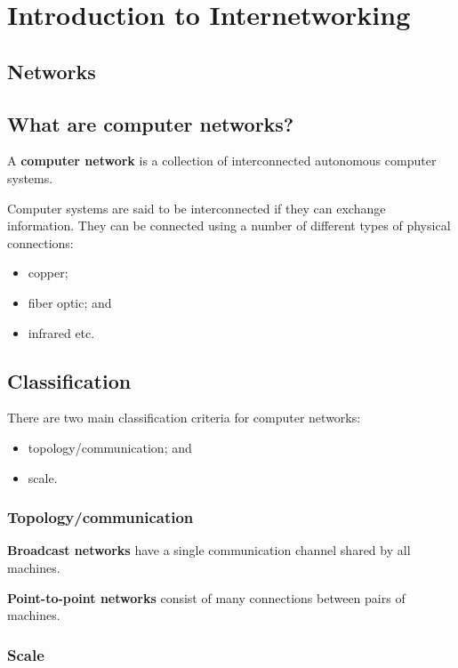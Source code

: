 \documentclass[a4paper]{systems-software}
\begin{document}
\chapter{Introduction to Internetworking}
\label{chap:12}

\section{Networks}

\section*{What are computer networks?}

A \textbf{computer network} is a collection of interconnected autonomous computer systems.

Computer systems are said to be interconnected if they can exchange information. They can be connected using a number of different types of physical connections:
\begin{itemize}
	\item copper;
	\item fiber optic; and
	\item infrared etc.
\end{itemize}


\section*{Classification}

There are two main classification criteria for computer networks:
\begin{itemize}
	\item topology/communication; and
	\item scale.
\end{itemize}


\subsection*{Topology/communication}

\textbf{Broadcast networks} have a single communication channel shared by all machines.

\textbf{Point-to-point networks} consist of many connections between pairs of machines.


\newpage

\subsection*{Scale}
\end{document}
